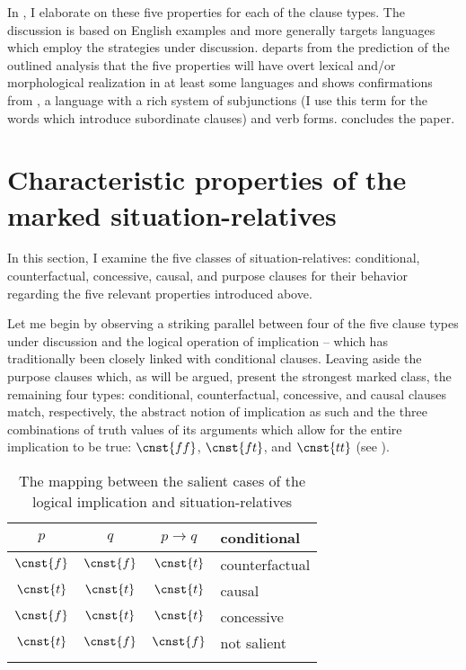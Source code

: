 \documentclass[output=paper]{langscibook}
\begin{document}
In , I elaborate on these five properties for each of the clause types. The discussion is based on English examples and more generally targets languages which employ the strategies under discussion.  departs from the prediction of the outlined analysis that the five properties will have overt lexical and/or morphological realization in at least some languages and shows confirmations from , a language with a rich system of subjunctions (I use this term for the words which introduce subordinate clauses) and verb forms.  concludes the paper.


\section{Characteristic properties of the marked situation-relatives}\label{sec:Properties}

In this section, I examine the five classes of situation-relatives: conditional, counterfactual, concessive, causal, and purpose clauses for their behavior regarding the five relevant properties introduced above.

Let me begin by observing a striking parallel between four of the five clause types under discussion and the logical operation of implication -- which has traditionally been closely linked with conditional clauses. Leaving aside the purpose clauses which, as will be argued, present the strongest marked class, the remaining four types: conditional, counterfactual, concessive, and causal clauses match, respectively, the abstract notion of implication as such and the three combinations of truth values of its arguments which allow for the entire implication to be true: $\cnst{ff}$, $\cnst{ft}$, and $\cnst{tt}$ (see ).

\begin{table}
\centering
\begin{tabularx}{.45\textwidth}{cccX}
    \lsptoprule
    $p$ & $q$ & $p\rightarrow q$ & conditional \\\midrule
    $\cnst{f}$ & $\cnst{f}$ & $\cnst{t}$ & counterfactual \\
    $\cnst{t}$ & $\cnst{t}$ & $\cnst{t}$ & causal \\
    $\cnst{f}$ & $\cnst{t}$ & $\cnst{t}$ & concessive \\
    \textcolor{lsDOIGray}{$\cnst{t}$} & \textcolor{lsDOIGray}{$\cnst{f}$} & \textcolor{lsDOIGray}{$\cnst{f}$} & not salient\\
    \lspbottomrule
\end{tabularx}
\caption{The mapping between the salient cases of the logical implication and situation-relatives}
\label{tab:Implic}
\end{table}
\end{document}
